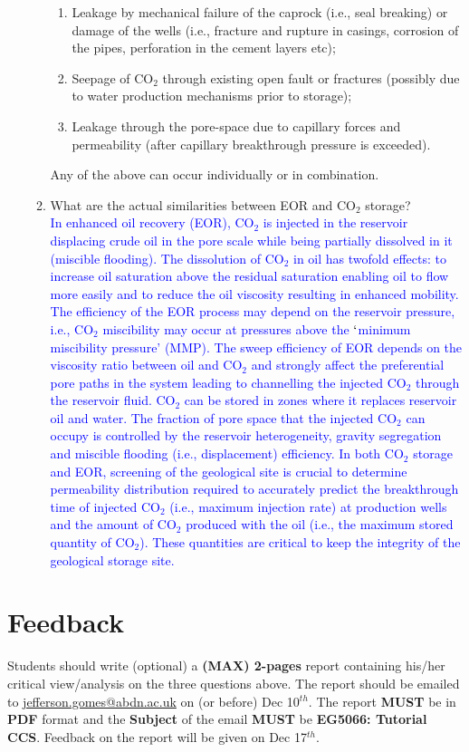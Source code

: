\documentclass[14pt,twoside]{article}
\begin{document}
\begin{enumerate}
\begin{enumerate}
{\begin{enumerate}
\item Leakage by mechanical failure of the caprock (i.e., seal breaking) or damage of the wells (i.e., fracture and rupture in casings, corrosion of the pipes, perforation in the cement layers  etc);
\item Seepage of CO$_{\text{2}}$ through existing open fault or fractures (possibly due to water production mechanisms prior to storage);
\item Leakage through the pore-space due to capillary forces and permeability (after capillary breakthrough pressure is exceeded). 
\end{enumerate}
Any of the above can occur individually or in combination.
}
\item What are the actual similarities between EOR and CO$_{2}$ storage?\\
  \textcolor{blue}{
In enhanced oil recovery (EOR), CO$_{\text{2}}$ is injected in the reservoir displacing crude oil in the pore scale while being partially dissolved in it (miscible flooding). The dissolution of CO$_{\text{2}}$ in oil has twofold effects: to increase oil saturation above the residual saturation enabling oil to flow more easily and to reduce the oil viscosity resulting in enhanced mobility. The efficiency of the EOR process may depend on the reservoir pressure, i.e., CO$_{\text{2}}$ miscibility may occur at pressures above the $\lq$minimum miscibility pressure' (MMP). The sweep efficiency of EOR depends on the viscosity ratio between oil and CO$_{\text{2}}$ and strongly affect the preferential pore paths in the system leading to channelling the injected CO$_{\text{2}}$ through the reservoir fluid. CO$_{\text{2}}$ can be stored in zones where it replaces reservoir oil and water.  The fraction of pore space that the injected CO$_{\text{2}}$ can occupy is controlled by the reservoir heterogeneity, gravity segregation and miscible flooding (i.e., displacement) efficiency. In both CO$_{\text{2}}$ storage and EOR, screening of the geological site is crucial to determine permeability distribution required to accurately predict the breakthrough time of injected CO$_{\text{2}}$ (i.e., maximum injection rate) at production wells and the amount of CO$_{\text{2}}$ produced with the oil (i.e., the  maximum stored quantity of CO$_{\text{2}}$). These quantities are critical to keep the integrity of the geological storage site. 
}
\end{enumerate} 
\end{enumerate}

\section{Feedback}
Students should write (optional) a {\bf (MAX) 2-pages} report containing his/her critical view/analysis on the three questions above. The report should be emailed to \href{mailto:jefferson.gomes@abdn.ac.uk}{jefferson.gomes@abdn.ac.uk} on (or before) Dec 10$^{th}$. The report {\bf MUST} be in {\bf PDF} format and the {\bf Subject} of the email {\bf MUST} be {\bf EG5066: Tutorial CCS}. Feedback on the report will be given on Dec 17$^{th}$.


\clearpage

   
\end{document}

